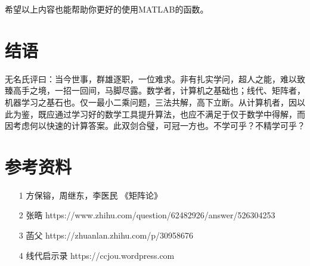 希望以上内容也能帮助你更好的使用MATLAB的函数。


\section{结语}
无名氏评曰：当今世事，群雄逐职，一位难求。非有扎实学问，超人之能，难以致臻高手之境，一招一回间，马脚尽露。数学者，计算机之基础也；线代、矩阵者，机器学习之基石也。仅一最小二乘问题，三法共解，高下立断。从计算机者，因以此为鉴，既应通过学习好的数学工具提升算法，也应不满足于仅于数学中得解，而因考虑何以快速的计算答案。此双剑合璧，可冠一方也。不学可乎？不精学可乎？

\section*{参考资料}
\begin{itemize}
    \item[1] 方保镕，周继东，李医民 《矩阵论》
    \item[2] 张晧 https://www.zhihu.com/question/62482926/answer/526304253
    \item[3] 菡父 https://zhuanlan.zhihu.com/p/30958676
    \item[4] 线代启示录 https://ccjou.wordpress.com
\end{itemize}
